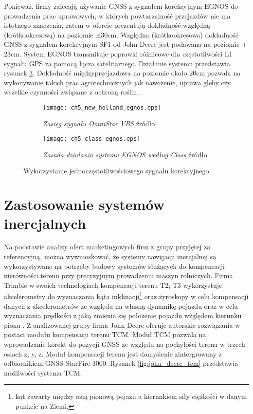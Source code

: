 Ponieważ, firmy zalecają używanie GNSS z sygnałem korekcyjnym EGNOS do prowadzenia prac uprawowych, w których powtarzalność przejazdów nie 
ma istotnego znaczenia, zatem w ofercie prezentują dokładność względną (krótkookresową) na poziomie $\pm$30cm. Względna (krótkookresowa) dokładność GNSS z sygnałem
korekcyjnym SF1 od John Deere jest podawana na poziomie $\pm$23cm. System EGNOS transmituje poprawki różnicowe dla częstotliwości L1 sygnału GPS za pomocą łącza satelitarnego.
Działanie systemu przedstawia rysunek \ref{fig:class_egnos}. Dokładność międzyprzejazdowa na poziomie około 20cm pozwala na wykonywanie takich prac agrotechnicznych 
jak nawożenie, uprawa gleby czy wszelkie czynności związane z ochroną roślin \cite[][strona 28]{CLAAS_stearing_systems}.
\begin{figure}[H]
\centering
        \begin{subfigure}{0.4\textwidth}
                \centering
                \texttt{[image: ch5\_new\_holland\_egnos.eps]}
                \caption{\textit{Zasięg sygnału OmniStar VBS} źródło \cite[][strona 4]{NEW_HOLLAND_PLM}}
                \label{fig:omnistar_vbs}
        \end{subfigure}
        \begin{subfigure}{0.4\textwidth}
                \centering
                \texttt{[image: ch5\_class\_egnos.eps]}
                \caption{\textit{Zasada działania systemu EGNOS według Class} źródło \cite[][strona 26]{CLAAS_stearing_systems}}
                \label{fig:class_egnos}
        \end{subfigure}
\caption{Wykorzystanie jednoczęstotliwościowego sygnału korekcyjnego}
\end{figure}
\indent 
 
\section{Zastosowanie systemów inercjalnych}
Na podstawie analizy ofert marketingowych firm z grupy przyjętej za referencyjną, można wywnioskować, że systemy nawigacji inercjalnej 
są wykorzystywane na potrzeby budowy systemów służących do kompensacji nierówności terenu przy precyzyjnym prowadzeniu maszyn rolniczych.
Firma Trimble w swoich technologiach kompensacji terenu T2, T3 wykorzystuje akcelerometry do wyznaczania kąta inklinacji\footnote{kąt zawarty między osią 
pionową pojazu a kierunkiem siły ciężkości w danym punkcie na Ziemi.} oraz żyroskopy w celu kompensacji danych z akcelerometrów ze względu na własną dynamikę pojazdu oraz 
w celu wyznaczania prędkości z jaką zmienia się położenie pojazdu względem kierunku pionu \cite[]{TRIMBLE}.
Z analizowanej grupy firma John Deere oferuje autorskie rozwiązania w postaci modułu kompensacji terenu TCM. Moduł TCM pozwala na wprowadzanie korekt 
do pozycji GNSS ze względu na pochyłości terenu w trzech osiach z, y, z. Moduł kompensacji terenu jest domyślenie zintergrowany z odbiornikiem GNSS StarFire 3000.
Rysunek \ref{fig:john_deere_tcm} przedstawia możliwości systemu TCM. 

